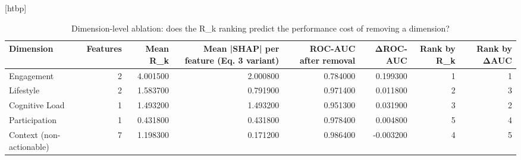 \begin{table}
\small[htbp]
\caption{Dimension-level ablation: does the R_k ranking predict the performance cost of removing a dimension?}
\label{tab:S08_dimension_ablation}
\begin{tabular}{lrrrrrrr}
\toprule
Dimension & Features & Mean R\_k & Mean |SHAP| per feature (Eq. 3 variant) & ROC-AUC after removal & ΔROC-AUC & Rank by R\_k & Rank by ΔAUC \\
\midrule
Engagement & 2 & 4.001500 & 2.000800 & 0.784000 & 0.199300 & 1 & 1 \\
Lifestyle & 2 & 1.583700 & 0.791900 & 0.971400 & 0.011800 & 2 & 3 \\
Cognitive Load & 1 & 1.493200 & 1.493200 & 0.951300 & 0.031900 & 3 & 2 \\
Participation & 1 & 0.431800 & 0.431800 & 0.978400 & 0.004800 & 5 & 4 \\
Context (non-actionable) & 7 & 1.198300 & 0.171200 & 0.986400 & -0.003200 & 4 & 5 \\
\bottomrule
\end{tabular}
\end{table}
